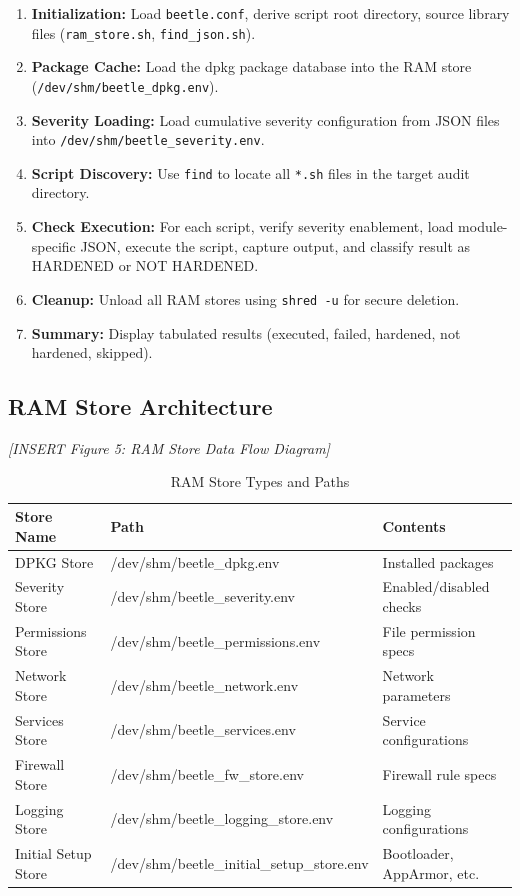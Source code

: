 \begin{enumerate}[noitemsep]
    \item \textbf{Initialization:} Load \texttt{beetle.conf}, derive script root directory, source library files (\texttt{ram\_store.sh}, \texttt{find\_json.sh}).
    \item \textbf{Package Cache:} Load the dpkg package database into the RAM store (\texttt{/dev/shm/beetle\_dpkg.env}).
    \item \textbf{Severity Loading:} Load cumulative severity configuration from JSON files into \texttt{/dev/shm/beetle\_severity.env}.
    \item \textbf{Script Discovery:} Use \texttt{find} to locate all \texttt{*.sh} files in the target audit directory.
    \item \textbf{Check Execution:} For each script, verify severity enablement, load module-specific JSON, execute the script, capture output, and classify result as HARDENED or NOT HARDENED.
    \item \textbf{Cleanup:} Unload all RAM stores using \texttt{shred -u} for secure deletion.
    \item \textbf{Summary:} Display tabulated results (executed, failed, hardened, not hardened, skipped).
\end{enumerate}

\subsection{RAM Store Architecture}

\vspace{0.5cm}
\noindent\textit{[INSERT Figure 5: RAM Store Data Flow Diagram]}
\vspace{0.5cm}

\begin{table}[H]
\centering
\caption{RAM Store Types and Paths}
\small
\begin{tabular}{|p{4cm}|p{5cm}|p{4cm}|}
\hline
\textbf{Store Name} & \textbf{Path} & \textbf{Contents} \\
\hline
DPKG Store & /dev/shm/beetle\_dpkg.env & Installed packages \\
\hline
Severity Store & /dev/shm/beetle\_severity.env & Enabled/disabled checks \\
\hline
Permissions Store & /dev/shm/beetle\_permissions.env & File permission specs \\
\hline
Network Store & /dev/shm/beetle\_network.env & Network parameters \\
\hline
Services Store & /dev/shm/beetle\_services.env & Service configurations \\
\hline
Firewall Store & /dev/shm/beetle\_fw\_store.env & Firewall rule specs \\
\hline
Logging Store & /dev/shm/beetle\_logging\_store.env & Logging configurations \\
\hline
Initial Setup Store & /dev/shm/beetle\_initial\_setup\_store.env & Bootloader, AppArmor, etc. \\
\hline
\end{tabular}
\label{tab:ramstore}
\end{table}

